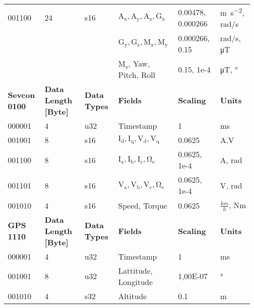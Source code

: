\begin{sidewaystable}
\begin{tabular}{@{\makebox[3em][r]{\rownumber\space}}|llllll}
			001100               & 24                   & s16                 & $\mathrm{A_x, A_y, A_z, G_x}$            & 0.00478,  0.000266 & \si{\meter \per \second \squared}, rad/s        \\
			&                      &                     & $\mathrm{G_y, G_z, M_x, M_y}$              & 0.000266, 0.15     & rad/s, \si{\micro \tesla}                       \\
			&                      &                     & $\mathrm{M_z}$, Yaw, Pitch, Roll        & 0.15, 1e-4         & \si{\micro \tesla}, \si{\degree}                    \\
			\hline
			\textbf{Sevcon 0100} & \textbf{Data Length [Byte]} & \textbf{Data Types} & \textbf{Fields}             & \textbf{Scaling}   & \textbf{Units}                                    \\
			\hline
			000001               & 4                    & u32                 & Timestamp                   & 1                  & ms                                                \\
			001001               & 8                    & s16                 & $\mathrm{I_d,I_q,V_d,V_q}$                & 0.0625             & A,V                                               \\
			001100               & 8                    & s16                 & $\mathrm{I_a, I_b, I_c, \Omega_e}$ & 0.0625, 1e-4       & A, rad                                            \\
			001101               & 8                    & s16                 & $\mathrm{V_a, V_b, V_c, \Omega_e}$ & 0.0625, 1e-4       & V, rad                                            \\
			001010               & 4                    & s16                 & Speed, Torque               & 0.0625             & $\frac{km}{h}$, Nm                              \\
			\hline
			\textbf{GPS 1110}    & \textbf{Data Length [Byte]} & \textbf{Data Types} & \textbf{Fields}             & \textbf{Scaling}   & \textbf{Units}                                    \\
			\hline
			000001               & 4                    & u32                 & Timestamp                   & 1                  & ms                                                \\
			001001               & 8                    & u32                 & Lattitude, Longitude        & 1,00E-07           & \si{\degree} \\
			001010               & 4                    & s32                 & Altitude                    & 0.1                & m                                                
			

\end{tabular}
\end{sidewaystable}
